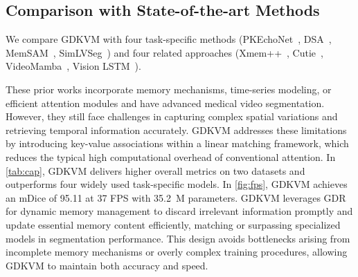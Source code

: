 \subsection{Comparison with State-of-the-art Methods}
    \label{subsec:comparisons}
We compare GDKVM with four task-specific methods (PKEchoNet~\cite{wu2023super}, DSA~\cite{lin2024dynamic}, MemSAM~\cite{deng2024memsam}, SimLVSeg~\cite{maani2024simlvseg}) and four related approaches (Xmem++~\cite{bekuzarov2023xmemproductionlevelvideosegmentation}, Cutie~\cite{cheng2024puttingobjectvideoobject}, VideoMamba~\cite{li2024videomambastatespacemodel}, Vision LSTM~\cite{beck:24xlstm}). 

These prior works incorporate memory mechanisms, time-series modeling, or efficient attention modules and have advanced medical video segmentation. However, they still face challenges in capturing complex spatial variations and retrieving temporal information accurately. GDKVM addresses these limitations by introducing key-value associations within a linear matching framework, which reduces the typical high computational overhead of conventional attention. In \cref{tab:cap}, GDKVM delivers higher overall metrics on two datasets and outperforms four widely used task-specific models. In \cref{fig:fps}, GDKVM achieves an mDice of 95.11 at 37 FPS with 35.2~M parameters. GDKVM leverages GDR for dynamic memory management to discard irrelevant information promptly and update essential memory content efficiently, matching or surpassing specialized models in segmentation performance. This design avoids bottlenecks arising from incomplete memory mechanisms or overly complex training procedures, allowing GDKVM to maintain both accuracy and speed.